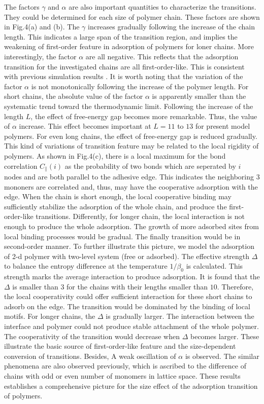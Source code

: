 \documentclass[aps,pre,twocolumn,showpacs,preprintnumbers,amsmath,amssymb]{revtex4-1}
\begin{document}
The factors $\gamma$ and $\alpha$ are also important quantities
to characterize the transitions. They could be determined for
each size of polymer chain. These factors are shown in Fig.4(a) and (b).
The $\gamma$ increases gradually following the increase of the chain
length. This indicates a large span of the transition region, and implies
the weakening of first-order feature in adsorption of polymers for
loner chains. More interestingly, the factor $\alpha$ are all negative.
This reflects that the adsorption transition for the investigated chains
are all first-order-like. This is consistent with previous simulation
results \cite{PCCP10,JCP09,JCP09b}.
It is worth noting that the variation of the factor $\alpha$ is
not monotonically following the increase of the polymer length.
For short chains, the absolute value of the factor $\alpha$ is apparently
smaller than the systematic trend toward the thermodynamic limit.
Following the increase of the
length $L$, the effect of free-energy gap becomes more remarkable. Thus,
the value of $\alpha$ increase. This effect becomes important at $L=11$ to
$13$ for present model polymers. For even long chains, the effect of
free-energy gap is reduced gradually.
This kind of variations of transition feature may be related to the local rigidity
of polymers. As shown in Fig.4(c), there is a local maximum for the bond
correlation $C_{\parallel}(i)$ as the probability of two bonds which are
seperated by $i$ nodes and are both parallel to the adhesive edge. This
indicates the neighboring $3$ mononers are correlated and, thus, may
have the cooperative adsorption with the edge. When the chain is short
enough, the local cooperative binding may sufficiently stabilize the adsorption
of the whole chain, and produce the first-order-like transitions. Differently,
for longer chain, the local interaction is not enough to produce the whole
adsorption. The growth of more adsorbed sites from local binding processes
would be gradual. The finally transition would be in second-order manner.
To further illustrate this picture, we model the adsorption of 2-d polymer with
two-level system (free or adsorbed). The effective strength $\Delta$ to balance the 
entropy difference at the temperature $1/\beta_0$ is calculated. This strength
marks the average interaction to produce adsorption. It is found
that the $\Delta$ is smaller than $3$ for the chains with their lengths smaller than $10$.
Therefore, the local cooperativity could offer sufficient interaction for these short chains
to adsorb on the edge. The transition would be dominated by the binding of local
motifs. For longer chains, the $\Delta$ is gradually larger. The interaction between
the interface and polymer could not produce stable attachment of the whole polymer.
The cooperativity of the transition would decrease when $\Delta$ becomes larger.
These illustrate the basic source of first-order-like feature and the size-dependent
conversion of transitions. Besides, A weak oscillation of $\alpha$
is observed. The similar phenomena are also observed previously\cite{JCP10b},
which is ascribed to the difference of chains with odd or even number of
monomers in lattice space. These results establishes a comprehensive picture for
the size effect
of the adsorption transition of polymers.
\end{document}
